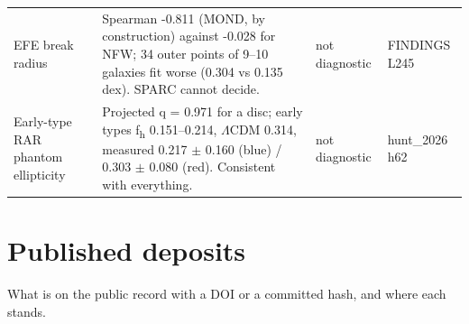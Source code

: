 \documentclass[10pt]{article}
\begin{document}
{\begin{longtable}{>{\raggedright\arraybackslash}p{4.4cm}>{\raggedright\arraybackslash}p{11.6cm}>{\raggedright\arraybackslash}p{2.0cm}>{\raggedright\arraybackslash}p{3.4cm}}
EFE break radius & Spearman -0.811 (MOND, by construction) against -0.028 for NFW; 34 outer points of 9--10 galaxies fit worse (0.304 vs 0.135 dex). SPARC cannot decide. & not diagnostic & FINDINGS L245 \\
Early-type RAR phantom ellipticity & Projected q = 0.971 for a disc; early types f\textsubscript{h} 0.151--0.214, \ensuremath{\Lambda}CDM 0.314, measured 0.217 \ensuremath{\pm} 0.160 (blue) / 0.303 \ensuremath{\pm} 0.080 (red). Consistent with everything. & not diagnostic & hunt\_2026 h62 \\
\bottomrule\end{longtable}}

\section{Published deposits}
What is on the public record with a DOI or a committed hash, and where each stands.
\end{document}
